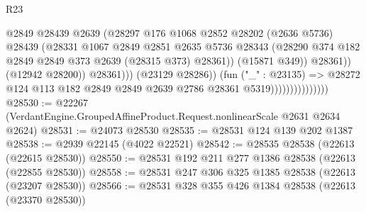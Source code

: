 \begin{lexlean}{R23}
\begin{coremodule}
                                              @2849
                                              @28439
                                              @2639
                                              (@28297
                                                @176
                                                @1068
                                                @2852
                                                @28202
                                                (@2636 @5736)
                                                @28439
                                                (@28331
                                                  @1067
                                                  @2849
                                                  @2851
                                                  @2635
                                                  @5736
                                                  @28343
                                                  (@28290
                                                    @374
                                                    @182
                                                    @2849
                                                    @2849
                                                    @373
                                                    @2639
                                                    (@28315 @373)
                                                    @28361))
                                                (@15871 @349))
                                              @28361))
                                          (@12942 @28200))
                                        @28361)))
                                  (@23129 @28286))
                                (fun ("_" : @23135) =>
                                @28272
                                  @124
                                  @113
                                  @182
                                  @2849
                                  @2849
                                  @2639
                                  @2786
                                  @28361
                                  @5319)))))))))))))))
@28530 := @22267 (VerdantEngine.GroupedAffineProduct.Request.nonlinearScale @2631 @2634 @2624)
@28531 := @24073 @28530
@28535 := @28531 @124 @139 @202 @1387
@28538 := @2939 @22145 (@4022 @22521)
@28542 := @28535 @28538 (@22613 (@22615 @28530))
@28550 := @28531 @192 @211 @277 @1386 @28538 (@22613 (@22855 @28530))
@28558 := @28531 @247 @306 @325 @1385 @28538 (@22613 (@23207 @28530))
@28566 := @28531 @328 @355 @426 @1384 @28538 (@22613 (@23370 @28530))

\end{coremodule}
\end{lexlean}

